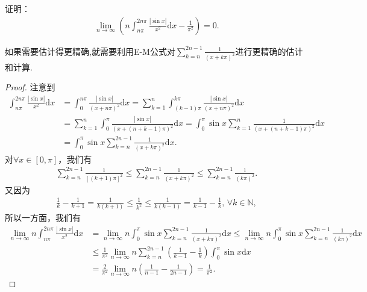 \documentclass[../../main.tex]{subfiles}%
\begin{document}
\begin{example}
证明：
\begin{align*}
\lim_{n \to \infty} \left( n \int_{n\pi}^{2n\pi} \frac{|\sin x|}{x^2} \mathrm{d}x - \frac{1}{\pi^2} \right) = 0.
\end{align*}
\end{example}
\begin{note}
如果需要估计得更精确,就需要利用E-M公式对$\sum_{k=n}^{2n - 1} \frac{1}{(x + k\pi)^2}$进行更精确的估计和计算.
\end{note}
\begin{proof}

注意到
\begin{align*}
\int_{n\pi}^{2n\pi} \frac{|\sin x|}{x^2} \mathrm{d}x &= \int_0^{n\pi} \frac{|\sin x|}{(x + n\pi)^2} \mathrm{d}x = \sum_{k=1}^n \int_{(k-1)\pi}^{k\pi} \frac{|\sin x|}{(x + n\pi)^2} \mathrm{d}x \\
&= \sum_{k=1}^n \int_0^{\pi} \frac{|\sin x|}{(x + (n + k - 1)\pi)^2} \mathrm{d}x = \int_0^{\pi} \sin x \sum_{k=1}^n \frac{1}{(x + (n + k - 1)\pi)^2} \mathrm{d}x \\
&= \int_0^{\pi} \sin x \sum_{k=n}^{2n - 1} \frac{1}{(x + k\pi)^2} \mathrm{d}x.
\end{align*}
对$\forall x \in [0, \pi]$，我们有
\begin{align*}
\sum_{k=n}^{2n - 1} \frac{1}{[(k + 1)\pi]^2} \leqslant  \sum_{k=n}^{2n - 1} \frac{1}{(x + k\pi)^2} \leqslant  \sum_{k=n}^{2n - 1} \frac{1}{(k\pi)^2}.
\end{align*}
又因为
\begin{align*}
\frac{1}{k} - \frac{1}{k + 1} = \frac{1}{k(k + 1)} \leqslant  \frac{1}{k^2} \leqslant  \frac{1}{k(k - 1)} = \frac{1}{k - 1} - \frac{1}{k}, \, \forall k \in \mathbb{N},
\end{align*}
所以一方面，我们有
\begin{align*}
\lim_{n \to \infty} n \int_{n\pi}^{2n\pi} \frac{|\sin x|}{x^2} \mathrm{d}x &= \lim_{n \to \infty} n \int_0^{\pi} \sin x \sum_{k=n}^{2n - 1} \frac{1}{(x + k\pi)^2} \mathrm{d}x \leqslant  \lim_{n \to \infty} n \int_0^{\pi} \sin x \sum_{k=n}^{2n - 1} \frac{1}{(k\pi)^2} \mathrm{d}x \\
&\leqslant  \frac{1}{\pi^2} \lim_{n \to \infty} n \sum_{k=n}^{2n - 1} \left( \frac{1}{k - 1} - \frac{1}{k} \right) \int_0^{\pi} \sin x \mathrm{d}x \\
&= \frac{2}{\pi^2} \lim_{n \to \infty} n \left( \frac{1}{n - 1} - \frac{1}{2n - 1} \right) = \frac{1}{\pi^2}.
\end{align*}

\end{proof}
\end{document}

